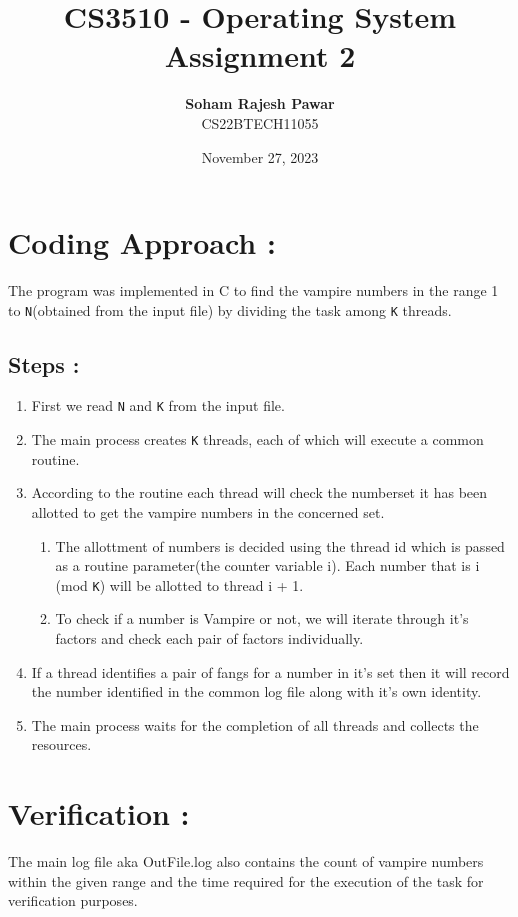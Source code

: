 \documentclass{article}
\title{\textbf{CS3510 - Operating System}\\Assignment 2}
\author{\textbf{Soham Rajesh Pawar}\\CS22BTECH11055}
\date{November 27, 2023}
\begin{document}
\maketitle

\section{Coding Approach :}
{\large The program was implemented in C to find the vampire numbers in the range 1 to \texttt{N}(obtained from the input file) by dividing the task among \texttt{K} threads.}
\\
\subsection{Steps :}
\begin{enumerate}
\item{First we read \texttt{N} and \texttt{K} from the input file.}
\item{The main process creates \texttt{K} threads, each of which will execute a common routine.}
\item{According to the routine each thread will check the numberset it has been allotted to get the vampire numbers in the concerned set.}
\begin{enumerate}
\item{The allottment of numbers is decided using the thread id which is passed as a routine parameter(the counter variable i). Each number that is i (mod \texttt{K}) will be allotted to thread i + 1.}
\item{To check if a number is Vampire or not, we will iterate through it's factors and check each pair of factors individually.}
\end{enumerate}
\item{If a thread identifies a pair of fangs for a number in it's set then it will record the number identified in the common log file along with it's own identity.}
\item{The main process waits for the completion of all threads and collects the resources.}
\end{enumerate}
\section{Verification :}
{\large The main log file aka OutFile.log also contains the count of vampire numbers within the given range and the time required for the execution of the task for verification purposes.}
\end{document}
